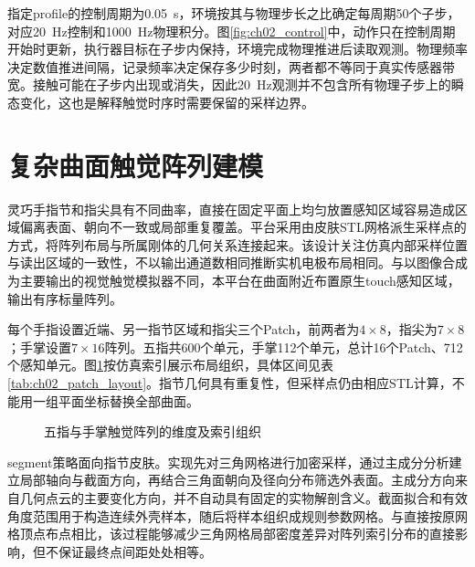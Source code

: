 指定profile的控制周期为0.05~s，环境按其与物理步长之比确定每周期50个子步，对应20~Hz控制和1000~Hz物理积分。图\ref{fig:ch02_control}中，动作只在控制周期开始时更新，执行器目标在子步内保持，环境完成物理推进后读取观测。物理频率决定数值推进间隔，记录频率决定保存多少时刻，两者都不等同于真实传感器带宽。接触可能在子步内出现或消失，因此20~Hz观测并不包含所有物理子步上的瞬态变化，这也是解释触觉时序时需要保留的采样边界。

\section{复杂曲面触觉阵列建模}
\label{sec:curved_tactile_array}

灵巧手指节和指尖具有不同曲率，直接在固定平面上均匀放置感知区域容易造成区域偏离表面、朝向不一致或局部重复覆盖。平台采用由皮肤STL网格派生采样点的方式，将阵列布局与所属刚体的几何关系连接起来。该设计关注仿真内部采样位置与读出区域的一致性，不以输出通道数相同推断实机电极布局相同。与以图像合成为主要输出的视觉触觉模拟器\cite{wang2022tacto,si2022taxim}不同，本平台在曲面附近布置原生touch感知区域，输出有序标量阵列。

每个手指设置近端、另一指节区域和指尖三个Patch，前两者为$4\times8$，指尖为$7\times8$；手掌设置$7\times16$阵列。五指共600个单元，手掌112个单元，总计16个Patch、712个感知单元。图\ref{fig:ch02_patch_order}按仿真索引展示布局组织，具体区间见表\ref{tab:ch02_patch_layout}。指节几何具有重复性，但采样点仍由相应STL计算，不能用一组平面坐标替换全部曲面。

\begin{figure}[htbp]
  \centering
  \caption{五指与手掌触觉阵列的维度及索引组织}
  \label{fig:ch02_patch_order}
\end{figure}

segment策略面向指节皮肤。实现先对三角网格进行加密采样，通过主成分分析建立局部轴向与截面方向，再结合三角面朝向及径向分布筛选外表面。主成分方向来自几何点云的主要变化方向，并不自动具有固定的实物解剖含义。截面拟合和有效角度范围用于构造连续外壳样本，随后将样本组织成规则参数网格。与直接按原网格顶点布点相比，该过程能够减少三角网格局部密度差异对阵列索引分布的直接影响，但不保证最终点间距处处相等。

